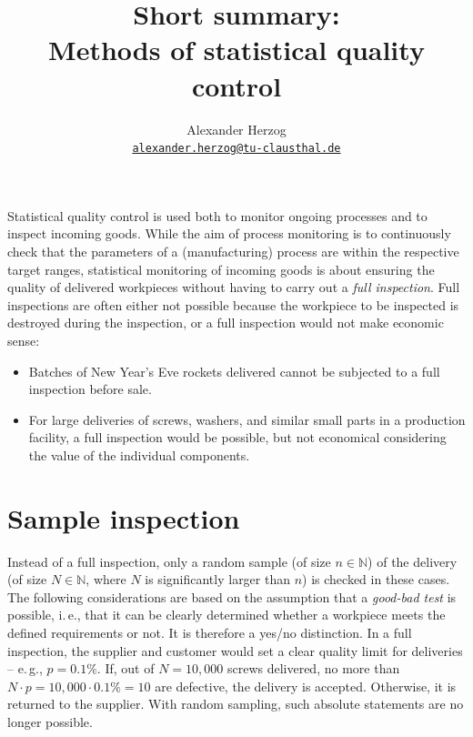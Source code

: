 \documentclass[a4paper,11pt,oneside]{article}
\begin{document}
\title{Short summary:\\Methods of statistical quality control}
\author{Alexander Herzog\\\href{mailto:alexander.herzog@tu-clausthal.de}{\small\texttt{alexander.herzog@tu-clausthal.de}}}
\date{}

\maketitle

Statistical quality control is used both to monitor ongoing processes and to inspect incoming goods. While the aim of process monitoring is to continuously check that the parameters of a (manufacturing) process are within the respective target ranges, statistical monitoring of incoming goods is about ensuring the quality of delivered workpieces without having to carry out a \emph{full inspection}. Full inspections are often either not possible because the workpiece to be inspected is destroyed during the inspection, or a full inspection would not make economic sense:

\begin{itemize}
\item
Batches of New Year's Eve rockets delivered cannot be subjected to a full inspection before sale.
\item
For large deliveries of screws, washers, and similar small parts in a production facility, a full inspection would be possible, but not economical considering the value of the individual components.
\end{itemize}



\section{Sample inspection}

Instead of a full inspection, only a random sample (of size $n\in\mathbb N$) of the delivery (of size $N\in\mathbb N$, where $N$ is significantly larger than $n$) is checked in these cases. The following considerations are based on the assumption that a \emph{good-bad test} is possible, i.\,e., that it can be clearly determined whether a workpiece meets the defined requirements or not. It is therefore a yes/no distinction. In a full inspection, the supplier and customer would set a clear quality limit for deliveries -- e.\,g., $p=0.1\%$. If, out of $N=10,000$ screws delivered, no more than $N\cdot p=10,000\cdot0.1\%=10$ are defective, the delivery is accepted. Otherwise, it is returned to the supplier. With random sampling, such absolute statements are no longer possible.
\end{document}
